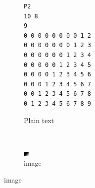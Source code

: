 \begin{figure}[h]
\centering
\begin{subfigure}[b]{0.45\textwidth}
\begin{minipage}{.45\linewidth}%
\begin{lstlisting}[label = li:ppmformat]
P2
10 8
9
0 0 0 0 0 0 0 0 1 2
0 0 0 0 0 0 0 1 2 3
0 0 0 0 0 0 1 2 3 4
0 0 0 0 0 1 2 3 4 5
0 0 0 0 1 2 3 4 5 6
0 0 0 1 2 3 4 5 6 7
0 0 1 2 3 4 5 6 7 8
0 1 2 3 4 5 6 7 8 9
\end{lstlisting}
\end{minipage}%
\caption{
    \tiny Plain text
  }
  \label{fig:ppmplain}
\end{subfigure}
~ %
\begin{subfigure}[b]{0.3\textwidth}
  \centering
  \includegraphics[width=\textwidth]{ppmexample}
  \caption{
    \tiny image
  }
  \label{fig:outmodered}
\end{subfigure}



\end{figure}

